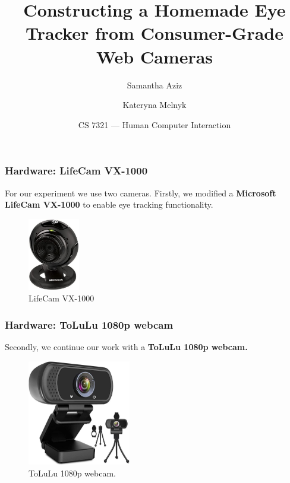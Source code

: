 \documentclass{beamer}
\title[Homemade Eye Tracker] %
{Constructing a Homemade Eye Tracker from Consumer-Grade Web Cameras}
\author[Sam, Kate] %
{Samantha Aziz\inst{1} \and Kateryna Melnyk\inst{1}}
\institute[TXSU] %
{
\inst{1}%
Faculty of Computer Science\\
Texas State University
}
\date[10/28/20] %
{CS 7321 — Human Computer Interaction}
\begin{document}
    \frame{\titlepage}

    \begin{frame}
        \frametitle{Hardware: LifeCam VX-1000}

        \center
        For our experiment we use two cameras.
        Firstly, we modified a \textbf{Microsoft LifeCam VX-1000} to enable eye
        tracking functionality.

        \begin{figure}
            \begin{center}
                \includegraphics[width=0.2\textwidth]{VX_1000.jpg}
            \end{center}
            \caption{LifeCam VX-1000}
            \label{fig:VX_100.}
        \end{figure}

    \end{frame}

    \begin{frame}
        \frametitle{Hardware: ToLuLu 1080p webcam}
        \center Secondly, we continue our work with a \textbf{ToLuLu 1080p
        webcam.}

        \begin{figure}
            \begin{center}
                \includegraphics[width=0.4\textwidth]{ToLuLu.jpg}
            \end{center}
            \caption{ToLuLu 1080p webcam.}
            \label{fig:Tolulu}
        \end{figure}

    \end{frame}
\end{document}
